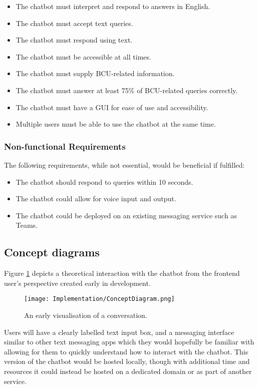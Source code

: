 \begin{itemize}
    \item The chatbot must interpret and respond to answers in English.
    \item The chatbot must accept text queries.
    \item The chatbot must respond using text.
    \item The chatbot must be accessible at all times.
    \item The chatbot must supply BCU-related information.
    \item The chatbot must answer at least 75\% of BCU-related queries correctly.
    \item The chatbot must have a GUI for ease of use and accessibility.
    \item Multiple users must be able to use the chatbot at the same time.
\end{itemize}

\subsubsection{Non-functional Requirements}
The following requirements, while not essential, would be beneficial if fulfilled:

\begin{itemize}
    \item The chatbot should respond to queries within 10 seconds.
    \item The chatbot could allow for voice input and output.
    \item The chatbot could be deployed on an existing messaging service such as Teams.
\end{itemize}

\subsection{Concept diagrams}

Figure \ref{fig:ConceptDiagram} depicts a theoretical interaction with the chatbot from the frontend user's perspective created 
early in development.

\begin{figure}[H]
    \centering
    \texttt{[image: Implementation/ConceptDiagram.png]}
    \caption{An early visualisation of a conversation.\label{fig:ConceptDiagram}}
\end{figure}

\noindent Users will have a clearly labelled text input box, and a messaging interface similar to other text messaging apps 
which they would hopefully be familiar with allowing for them to quickly understand how to interact with the chatbot.
This version of the chatbot would be hosted locally, though with additional time and resources it could instead be hosted on a 
dedicated domain or as part of another service.

